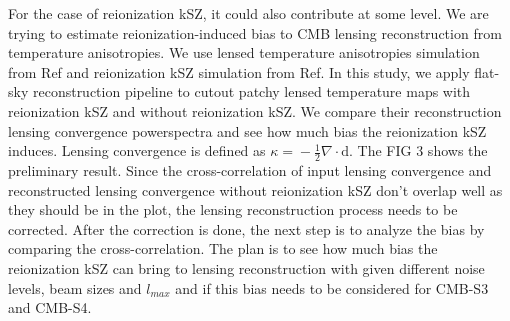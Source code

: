 \documentclass[12pt, notitlepage, onecolumn, amsmath, amssymb, aps]{revtex4-1}
\begin{document}
For the case of reionization kSZ, it could also contribute at some level. We are trying to estimate reionization-induced bias to CMB lensing reconstruction from temperature anisotropies. We use lensed temperature anisotropies simulation from Ref\cite{Stein:2020its} and reionization kSZ simulation from Ref\cite{Alvarez:2015xzu}. In this study, we apply flat-sky reconstruction pipeline to cutout patchy lensed temperature maps with reionization kSZ and without reionization kSZ. We compare their reconstruction lensing convergence powerspectra and see how much bias the reionization kSZ induces. Lensing convergence is defined as \(\kappa \mathrm=-\frac{1}{2} \nabla \cdot \mathrm{d}\). The FIG 3 shows the preliminary result. Since the cross-correlation of input lensing convergence and reconstructed lensing convergence without reionization kSZ don't overlap well as they should be in the plot, the lensing reconstruction process needs to be corrected. After the correction is done, the next step is to analyze the bias by comparing the cross-correlation. The plan is to see how much bias the reionization kSZ can bring to lensing reconstruction with given different noise levels, beam sizes and \(l_{max}\) and if this bias needs to be considered for CMB-S3 and CMB-S4.










\end{document}
